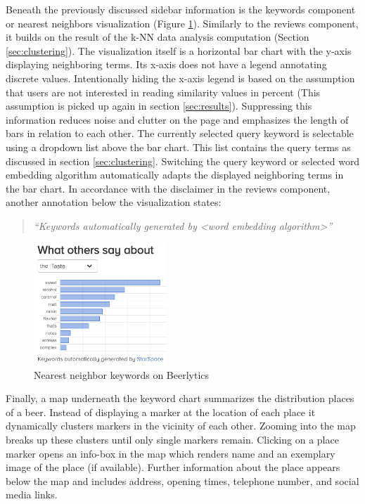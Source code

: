 Beneath the previously discussed sidebar information is the keywords component or nearest neighbors visualization (Figure \ref{fig:beer-nn}).
Similarly to the reviews component, it builds on the result of the k-NN data analysis computation (Section \ref{sec:clustering}).
The visualization itself is a horizontal bar chart with the y-axis displaying neighboring terms.
Its x-axis does not have a legend annotating discrete values.
Intentionally hiding the x-axis legend is based on the assumption that users are not interested in reading similarity values in percent (This assumption is picked up again in section \ref{sec:results}).
Suppressing this information reduces noise and clutter on the page and emphasizes the length of bars in relation to each other.
The currently selected query keyword is selectable using a dropdown list above the bar chart.
This list contains the query terms as discussed in section \ref{sec:clustering}.
Switching the query keyword or selected word embedding algorithm automatically adapts the displayed neighboring terms in the bar chart.
In accordance with the disclaimer in the reviews component, another annotation below the visualization states: 
\begin{quote}
\emph{``Keywords automatically generated by <word embedding algorithm>''}
\end{quote}

\begin{figure}[t]
\includegraphics[width=5cm]{assets/beer_keywords.png}
\caption{Nearest neighbor keywords on Beerlytics}
\centering
\label{fig:beer-nn}
\end{figure}

Finally, a map underneath the keyword chart summarizes the distribution places of a beer.
Instead of displaying a marker at the location of each place it dynamically clusters markers in the vicinity of each other.
Zooming into the map breaks up these clusters until only single markers remain.
Clicking on a place marker opens an info-box in the map which renders name and an exemplary image of the place (if available).
Further information about the place appears below the map and includes address, opening times, telephone number, and social media links.
